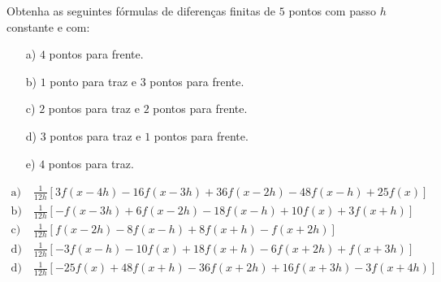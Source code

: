 \begin{exer}\label{exer:df_5pts_pi}
  Obtenha as seguintes fórmulas de diferenças finitas de $5$ pontos com passo $h$ constante e com:
  \begin{enumerate}
  \item[a)] $4$ pontos para frente.
  \item[b)] $1$ ponto para traz e $3$ pontos para frente.
  \item[c)] $2$ pontos para traz e $2$ pontos para frente.
  \item[d)] $3$ pontos para traz e $1$ pontos para frente.
  \item[e)] $4$ pontos para traz.
  \end{enumerate}
\end{exer}
\begin{resp}
  \begin{tiny}
    \begin{align*}
      \text{a)}&~\frac{1}{12 h} \left[3 f{\left (x- 4h \right )} - 16 f{\left (x- 3 h \right )} + 36 f{\left (x- 2 h \right )} - 48 f{\left (x- h \right ) + 25 f{\left (x \right )}}\right]\\
      \text{b)}&~\frac{1}{12 h} \left[- f{\left (x- 3 h \right )} + 6 f{\left ( x- 2 h \right )} - 18 f{\left (x- h \right )} + 10 f{\left (x \right )} + 3 f{\left (x+h \right )}\right]\\
      \text{c)}&~\frac{1}{12h} \left[f{\left (x - 2 h\right )} - 8 f{\left(x - h \right )} + 8 f{\left (x + h \right )} - f{\left (x + 2 h \right )}\right]\\
      \text{d)}&~\frac{1}{12 h} \left[- 3 f{\left ( x-h \right )} - 10 f{\left (x \right )} + 18 f{\left (x+h \right )} - 6 f{\left (x+2 h \right )} + f{\left ( x+3 h \right )}\right]\\
      \text{d)}&~\frac{1}{12 h} \left[- 25 f{\left (x \right )} + 48 f{\left ( x+h \right )} - 36 f{\left ( x+2 h \right )} + 16 f{\left ( x+3 h \right )} - 3 f{\left ( x+4 h \right )}\right]
    \end{align*}
  \end{tiny}
\end{resp}


